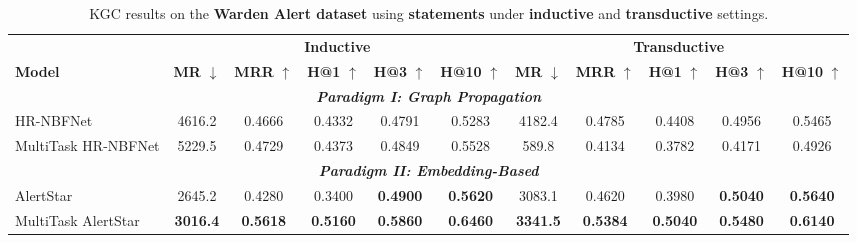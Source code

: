 \documentclass[10pt,journal,compsoc]{IEEEtran}
\begin{document}
\begin{table}[t]
\tiny
\centering
\caption{KGC results on the \textbf{Warden Alert dataset} 
         using \textbf{statements} under \textbf{inductive} and \textbf{transductive} settings.}
\label{tab:paradiam_compare}
\begin{tabular}{l ccccc ccccc}
\toprule
 & \multicolumn{5}{c}{\textbf{Inductive}} & \multicolumn{5}{c}{\textbf{Transductive}} \\
\cmidrule(lr){2-6} \cmidrule(lr){7-11}
\textbf{Model} & \textbf{MR} $\downarrow$ & \textbf{MRR} $\uparrow$ & \textbf{H@1} $\uparrow$ & \textbf{H@3} $\uparrow$& \textbf{H@10} $\uparrow$ & \textbf{MR} $\downarrow$ & \textbf{MRR} $\uparrow$& \textbf{H@1} $\uparrow$ & \textbf{H@3} $\uparrow$ & \textbf{H@10} $\uparrow$ \\
\midrule
\multicolumn{11}{c}{\textit{\textbf{Paradigm I: Graph Propagation}}} \\
\cmidrule{1-11}

HR-NBFNet                   & 4616.2 & 0.4666 & 0.4332 & 0.4791 & 0.5283 & 4182.4 & 0.4785 & 0.4408 & 0.4956 & 0.5465 \\
MultiTask HR-NBFNet         & 5229.5 & 0.4729 & 0.4373 & 0.4849 & 0.5528 & 589.8 & 0.4134 & 0.3782 & 0.4171 & 0.4926 \\
\midrule

\midrule
\multicolumn{11}{c}{\textit{\textbf{Paradigm II: Embedding-Based}}} \\
\midrule
AlertStar                        & 2645.2 & 0.4280 & 0.3400 & \textbf{0.4900} & \textbf{0.5620} & 3083.1 & 0.4620 & 0.3980 & \textbf{0.5040} & \textbf{0.5640}\\
MultiTask AlertStar         & \textbf{3016.4} & \textbf{0.5618} & \textbf{0.5160} & \textbf{0.5860} & \textbf{0.6460} & \textbf{3341.5} & \textbf{0.5384} & \textbf{0.5040} & \textbf{0.5480} & \textbf{0.6140}\\

\bottomrule
\end{tabular}
\end{table}



\end{document}
